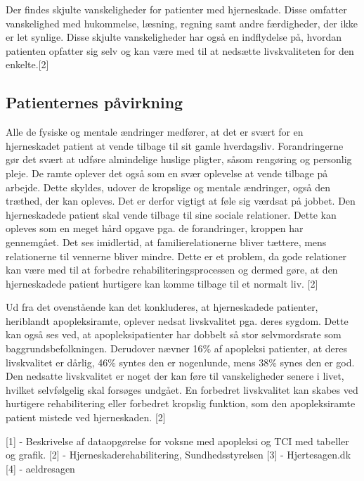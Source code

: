 Der findes skjulte vanskeligheder for patienter med hjerneskade. Disse omfatter vanskelighed med hukommelse, læsning, regning samt andre færdigheder, der ikke er let synlige. Disse skjulte vanskeligheder har også en indflydelse på, hvordan patienten opfatter sig selv og kan være med til at nedsætte livskvaliteten for den enkelte.[2] 

\subsection{Patienternes påvirkning}
Alle de fysiske og mentale ændringer medfører, at det er svært for en hjerneskadet patient at vende tilbage til sit gamle hverdagsliv. Forandringerne gør det svært at udføre almindelige huslige pligter, såsom rengøring og personlig pleje. De ramte oplever det også som en svær oplevelse at vende tilbage på arbejde. Dette skyldes, udover de kropslige og mentale ændringer, også den træthed, der kan opleves. Det er derfor vigtigt at føle sig værdsat på jobbet. Den hjerneskadede patient skal vende tilbage til sine sociale relationer. Dette kan opleves som en meget hård opgave pga. de forandringer, kroppen har gennemgået. Det ses imidlertid, at familierelationerne bliver tættere, mens relationerne til vennerne bliver mindre. Dette er et problem, da gode relationer kan være med til at forbedre rehabiliteringsprocessen og dermed gøre, at den hjerneskadede patient hurtigere kan komme tilbage til et normalt liv. [2]

Ud fra  det ovenstående kan det konkluderes, at hjerneskadede patienter, heriblandt apopleksiramte, oplever nedsat livskvalitet pga. deres sygdom. Dette kan også ses ved, at apopleksipatienter har dobbelt så stor selvmordsrate som baggrundsbefolkningen. Derudover nævner 16\% af apopleksi patienter, at deres livskvalitet er dårlig, 46\% syntes den er nogenlunde, mens 38\% synes den er god. Den nedsatte livskvalitet er noget der kan føre til vanskeligheder senere i livet, hvilket selvfølgelig skal forsøges undgået. En forbedret livskvalitet kan skabes ved hurtigere rehabilitering eller forbedret kropslig funktion, som den apopleksiramte patient mistede ved hjerneskaden. [2]  


[1] - Beskrivelse af dataopgørelse for voksne med apopleksi og TCI med tabeller og grafik. 
[2] - Hjerneskaderehabilitering, Sundhedsstyrelsen
[3] - Hjertesagen.dk
[4] - aeldresagen

